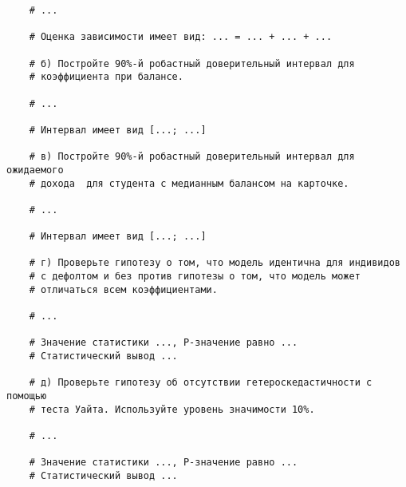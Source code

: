 \documentclass[12pt]{article}
\begin{document}
\begin{enumerate}
\begin{verbatim}
    # ...

    # Оценка зависимости имеет вид: ... = ... + ... + ...

    # б) Постройте 90%-й робастный доверительный интервал для 
    # коэффициента при балансе. 

    # ...

    # Интервал имеет вид [...; ...]

    # в) Постройте 90%-й робастный доверительный интервал для ожидаемого 
    # дохода  для студента с медианным балансом на карточке. 

    # ... 

    # Интервал имеет вид [...; ...]

    # г) Проверьте гипотезу о том, что модель идентична для индивидов 
    # с дефолтом и без против гипотезы о том, что модель может 
    # отличаться всем коэффициентами. 

    # ...

    # Значение статистики ..., P-значение равно ...
    # Статистический вывод ...

    # д) Проверьте гипотезу об отсутствии гетероскедастичности с помощью 
    # теста Уайта. Используйте уровень значимости 10%.
    
    # ...

    # Значение статистики ..., P-значение равно ...
    # Статистический вывод ...
\end{verbatim}



\end{enumerate}
\end{document}
